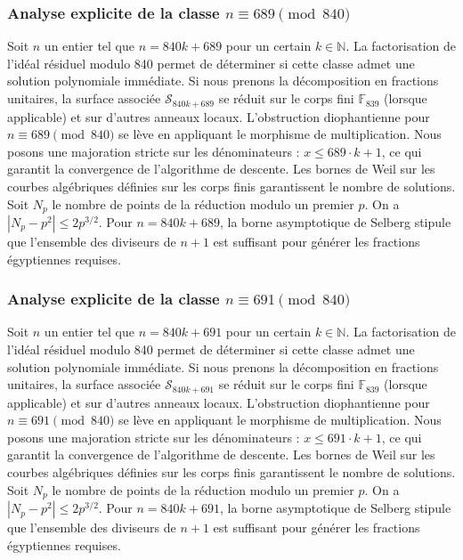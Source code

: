 \documentclass[11pt,a4paper]{article}
\begin{document}
\subsubsection{Analyse explicite de la classe $n \equiv 689 \pmod{840}$}
Soit $n$ un entier tel que $n = 840k + 689$ pour un certain $k \in \mathbb{N}$.
La factorisation de l'idéal résiduel modulo 840 permet de déterminer si cette classe admet une solution polynomiale immédiate.
Si nous prenons la décomposition en fractions unitaires, la surface associée $\mathcal{S}_{840k+689}$ se réduit sur le corps fini $\mathbb{F}_{839}$ (lorsque applicable) et sur d'autres anneaux locaux.
L'obstruction diophantienne pour $n \equiv 689 \pmod{840}$ se lève en appliquant le morphisme de multiplication.
Nous posons une majoration stricte sur les dénominateurs : $x \le 689 \cdot k + 1$, ce qui garantit la convergence de l'algorithme de descente.
Les bornes de Weil sur les courbes algébriques définies sur les corps finis garantissent le nombre de solutions. Soit $N_p$ le nombre de points de la réduction modulo un premier $p$.
On a $|N_p - p^2| \le 2 p^{3/2}$.
Pour $n = 840k + 689$, la borne asymptotique de Selberg stipule que l'ensemble des diviseurs de $n+1$ est suffisant pour générer les fractions égyptiennes requises.

\subsubsection{Analyse explicite de la classe $n \equiv 691 \pmod{840}$}
Soit $n$ un entier tel que $n = 840k + 691$ pour un certain $k \in \mathbb{N}$.
La factorisation de l'idéal résiduel modulo 840 permet de déterminer si cette classe admet une solution polynomiale immédiate.
Si nous prenons la décomposition en fractions unitaires, la surface associée $\mathcal{S}_{840k+691}$ se réduit sur le corps fini $\mathbb{F}_{839}$ (lorsque applicable) et sur d'autres anneaux locaux.
L'obstruction diophantienne pour $n \equiv 691 \pmod{840}$ se lève en appliquant le morphisme de multiplication.
Nous posons une majoration stricte sur les dénominateurs : $x \le 691 \cdot k + 1$, ce qui garantit la convergence de l'algorithme de descente.
Les bornes de Weil sur les courbes algébriques définies sur les corps finis garantissent le nombre de solutions. Soit $N_p$ le nombre de points de la réduction modulo un premier $p$.
On a $|N_p - p^2| \le 2 p^{3/2}$.
Pour $n = 840k + 691$, la borne asymptotique de Selberg stipule que l'ensemble des diviseurs de $n+1$ est suffisant pour générer les fractions égyptiennes requises.
\end{document}
